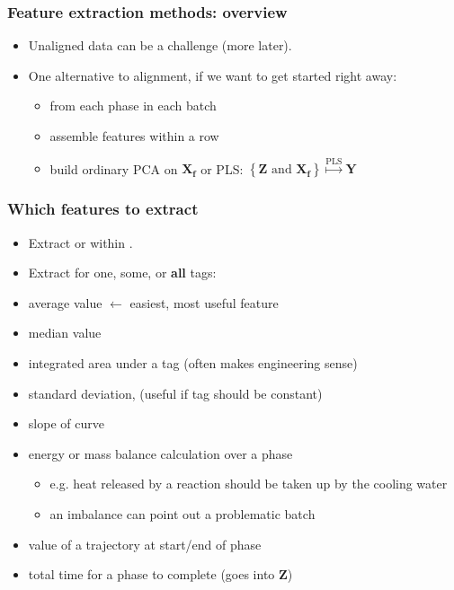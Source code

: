 \documentclass[handout, 12pt]{beamer}
\begin{document}
\begin{frame}\frametitle{Feature extraction methods: overview}

\begin{itemize}
	\item	Unaligned data can be a challenge (more later).
	
	\item	One alternative to alignment, if we want to get started right away: 
	
			\begin{itemize}
				\item	{} from each phase in each batch
				
				\item	assemble features within a row
				
				\item	build ordinary PCA on \( \mathbf{X_f} \) or PLS: \( \left\{ \mathbf{Z} \,\,\text{and}\,\, \mathbf{X_f}\right\} \stackrel{\text{PLS}}{\longmapsto} \mathbf{Y} \)
			\end{itemize}
			
\end{itemize}
\end{frame}

\begin{frame}\frametitle{Which features to extract}

\begin{itemize}
	\item	Extract {} or within {}. 
	
	\item	Extract for one, some, or \textbf{all} tags:
\end{itemize}\pause

\begin{itemize}
	\item	average value \hfill {\color{myOrange} $\leftarrow$ easiest, most useful feature}
	\item 	median value
	\item	integrated area under a tag (often makes engineering sense)
	\item	standard deviation, (useful if tag should be constant)
	\item	slope of curve\pause
	\item	energy or mass balance calculation over a phase
	 		\begin{itemize}
	 			\item	e.g. heat released by a reaction should be taken up by the cooling water
	 			\item	an imbalance can point out a problematic batch
	 		\end{itemize} \pause
	\item	value of a trajectory at start/end of phase
	\item	total time for a phase to complete (goes into \( \mathbf{Z} \))
\end{itemize}
\end{frame}
\end{document}
